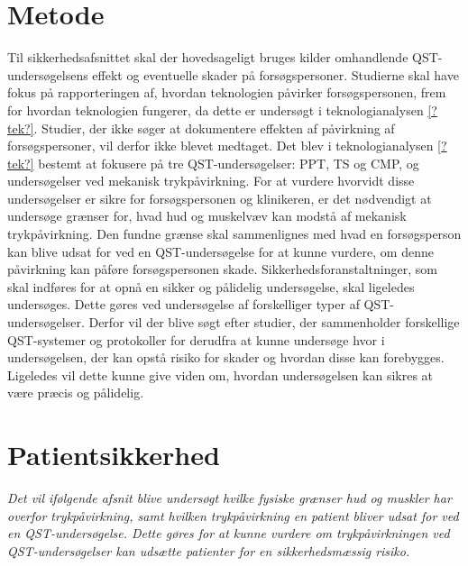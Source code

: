 \section{Metode}
Til sikkerhedsafsnittet skal der hovedsageligt bruges kilder omhandlende QST-undersøgelsens effekt og eventuelle skader på forsøgspersoner. Studierne skal have fokus på rapporteringen af, hvordan teknologien påvirker forsøgspersonen, frem for hvordan teknologien fungerer, da dette er undersøgt i teknologianalysen \ref{?tek?}. Studier, der ikke søger at dokumentere effekten af påvirkning af forsøgspersoner, vil derfor ikke blevet medtaget. Det blev i teknologianalysen \ref{?tek?} bestemt at fokusere på tre QST-undersøgelser: PPT, TS og CMP, og undersøgelser ved mekanisk trykpåvirkning. For at vurdere hvorvidt disse undersøgelser er sikre for forsøgspersonen og klinikeren, er det nødvendigt at undersøge grænser for, hvad hud og muskelvæv kan modstå af mekanisk trykpåvirkning. Den fundne grænse skal sammenlignes med hvad en forsøgsperson kan blive udsat for ved en QST-undersøgelse for at kunne vurdere, om denne påvirkning kan påføre forsøgspersonen skade. Sikkerhedsforanstaltninger, som skal indføres for at opnå en sikker og pålidelig undersøgelse, skal ligeledes undersøges. Dette gøres ved undersøgelse af forskelliger typer af QST-undersøgelser. Derfor vil der blive søgt efter studier, der sammenholder forskellige QST-systemer og protokoller for derudfra at kunne undersøge hvor i undersøgelsen, der kan opstå risiko for skader og hvordan disse kan forebygges. Ligeledes vil dette kunne give viden om, hvordan undersøgelsen kan sikres at være præcis og pålidelig. \citep{HTAcore}

\section{Patientsikkerhed}
\textit{Det vil ifølgende afsnit blive undersøgt hvilke fysiske grænser hud og muskler har overfor trykpåvirkning, samt hvilken trykpåvirkning en patient bliver udsat for ved en QST-undersøgelse. Dette gøres for at kunne vurdere om trykpåvirkningen ved QST-undersøgelser kan udsætte patienter for en sikkerhedsmæssig risiko.}


